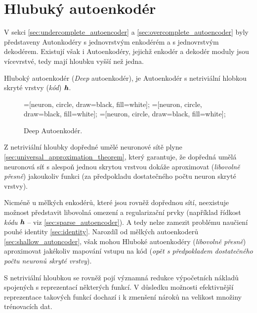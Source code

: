 \section{Hlubuký autoenkodér}
V sekci \autoref{sec:undercomplete_autoencoder} a \autoref{sec:overcomplete_autoencoder} byly představeny Autonkodéry s jednovrstvým enkodérém a s jednovrstvým dekodérem.
Existují však i Autoenkodéry, jejichž enkodér a dekodér moduly jsou vícevrstvé, tedy mají hloubku vyšší než jedna.

Hluboký autoenkodér (\emph{Deep} autoenkodér), je Autoenkodér s netriviální hlobkou skryté vrstvy (\emph{kód}) $\textbf{\emph{h}}$.

\begin{figure}[H]
    \centering
    \begin{neuralnetwork}[height=6]
        =[neuron, circle, draw=black, fill=white];
        =[neuron, circle, draw=black, fill=white];
        =[neuron, circle, draw=black, fill=white];
      
        \hiddenlayer[count=4, bias=false]
        \linklayers
        \hiddenlayer[count=2, bias=false]
        \linklayers
        \hiddenlayer[count=4, bias=false]
        \linklayers
        \outputlayer[count=6, text=\xout]
        \linklayers
      \end{neuralnetwork}
    \caption{Deep Autoenkodér.}
    \label{fig:stacked_autoencoder}
\end{figure}

Z netriviální hloubky dopředné umělé neuronové sítě plyne \autoref{sec:universal_approximation_theorem},
který garantuje, že dopředná umělá neuronová síť s alespoň jednou skrytou vrstvou dokáže aproximovat (\emph{libovolně přesně}) jakoukoliv funkci (za předpokladu dostatečného počtu neuron skryté vrstvy).

Nicméně u mělkých enkodérů, které jsou rovněž dopřednou sítí, neexistuje možnost představit libovolná omezení a regularizační prvky (například řídkost \emph{kódu} $\textbf{\emph{h}}$ – viz \autoref{sec:sparse_autoencoder}).
A tedy nelze zamezit problému naučiení pouhé identity \autoref{sec:identity}. Narozdíl od mělkých autoenkoderů \autoref{sec:shallow_autoncoder},
však mohou Hluboké autoenkodéry (\emph{libovolně přesně}) aproximovat jakékoliv mapování vstupu na kód (\emph{opět s předpokladem dostatečného počtu neuronů skryté vrstvy}).

S netriviální hloubkou se rovněž pojí významná redukce výpočetních nákladů spojených s reprezentací některých funkcí. 
V důsledku možnosti efektivnější reprezentace takových funkcí dochazí i k zmenšení nároků na velikost množiny trénovacích dat.

